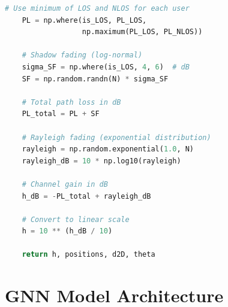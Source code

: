 \begin{lstlisting}[language=Python, caption={3GPP TR 38.901 UMa Channel Model Implementation}]
    # Use minimum of LOS and NLOS for each user
    PL = np.where(is_LOS, PL_LOS, 
                  np.maximum(PL_LOS, PL_NLOS))
    
    # Shadow fading (log-normal)
    sigma_SF = np.where(is_LOS, 4, 6)  # dB
    SF = np.random.randn(N) * sigma_SF
    
    # Total path loss in dB
    PL_total = PL + SF
    
    # Rayleigh fading (exponential distribution)
    rayleigh = np.random.exponential(1.0, N)
    rayleigh_dB = 10 * np.log10(rayleigh)
    
    # Channel gain in dB
    h_dB = -PL_total + rayleigh_dB
    
    # Convert to linear scale
    h = 10 ** (h_dB / 10)
    
    return h, positions, d2D, theta
\end{lstlisting}

\section{GNN Model Architecture}

